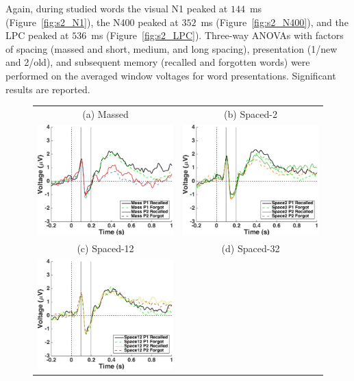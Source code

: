 Again, during studied words the visual N1 peaked at $144$~ms (Figure~\ref{fig:s2_N1}), the N400 peaked at $352$~ms (Figure~\ref{fig:s2_N400}), and the LPC peaked at $536$~ms (Figure~\ref{fig:s2_LPC}).
Three-way ANOVAs with factors of spacing (massed and short, medium, and long spacing), presentation (1/new and 2/old), and subsequent memory (recalled and forgotten words) were performed on the averaged window voltages for word presentations.  Significant results are reported.


\begin{figure}[hp]
  \centering
  \begin{tabular}{cc}
  \multicolumn{1}{c}{(a) Massed} & \multicolumn{1}{c}{(b) Spaced-2} \\
  \includegraphics[width=.35\textwidth]{./figs/exp2/tla_single_ga_word_rc_mass_p1_word_fo_mass_p1_word_rc_mass_p2_word_fo_mass_p2_E50_E51_E57_E58_E59_E64_E65_-200_1000_legend_xylabel} &
  \includegraphics[width=.35\textwidth]{./figs/exp2/tla_single_ga_word_rc_spac2_p1_word_fo_spac2_p1_word_rc_spac2_p2_word_fo_spac2_p2_E50_E51_E57_E58_E59_E64_E65_-200_1000_legend_xylabel} \\
  \multicolumn{1}{c}{(c) Spaced-12} & \multicolumn{1}{c}{(d) Spaced-32} \\
  \includegraphics[width=.35\textwidth]{./figs/exp2/tla_single_ga_word_rc_spac12_p1_word_fo_spac12_p1_word_rc_spac12_p2_word_fo_spac12_p2_E50_E51_E57_E58_E59_E64_E65_-200_1000_legend_xylabel} &

\end{tabular}
\end{figure}
